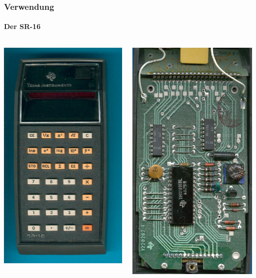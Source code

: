 \begin{frame}
\frametitle{Verwendung}
	\framesubtitle{Der SR-16}
	\begin{columns}
		\begin{column}{5cm}
			\centering
				\includegraphics[scale=0.3]{images/sr-16.jpg}
		\end{column}
		\begin{column}{5cm}
			\includegraphics[scale=0.4]{images/SR-16_PCBC.jpg}
		\end{column}
	\end{columns}
\end{frame}		
